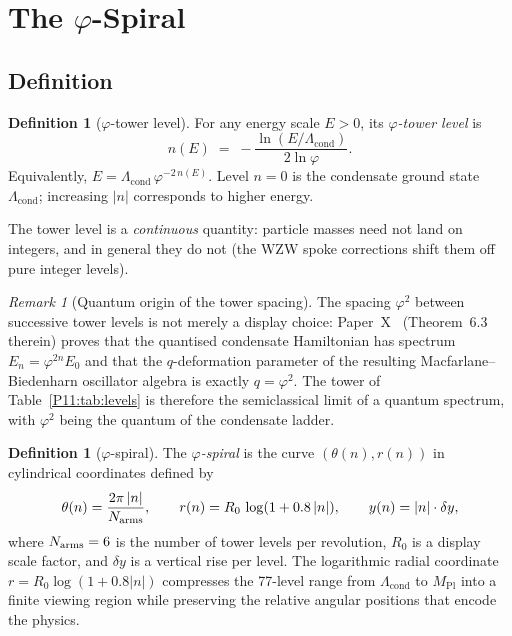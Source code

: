\documentclass[11pt,a4paper]{article}
\theoremstyle{definition}
\newtheorem{definition}[theorem]{Definition}
\theoremstyle{remark}
\newtheorem{remark}[theorem]{Remark}
\newcommand{\vp}{\varphi}
\newcommand{\Lcond}{\Lambda_{\mathrm{cond}}}
\newcommand{\MPl}{M_{\mathrm{Pl}}}
\newcommand{\nlvl}[1]{n\!\left(#1\right)}
\begin{document}
\section{The $\vp$-Spiral}
\label{P11:sec:spiral}

\subsection{Definition}

\begin{definition}[$\vp$-tower level]
\label{P11:def:tower_level}
For any energy scale $E > 0$, its \emph{$\vp$-tower level} is
\begin{equation}
  \nlvl{E} \;=\; -\frac{\ln(E/\Lcond)}{2\ln\vp}.
  \label{P11:eq:tower_level}
\end{equation}
Equivalently, $E = \Lcond\,\vp^{-2\,n(E)}$.
Level $n=0$ is the condensate ground state $\Lcond$;
increasing $|n|$ corresponds to higher energy.
\end{definition}

The tower level is a \emph{continuous} quantity: particle masses
need not land on integers, and in general they do not (the
WZW spoke corrections shift them off pure integer levels).

\begin{remark}[Quantum origin of the tower spacing]
\label{P11:rem:quantum_tower_origin}
The spacing $\vp^2$ between successive tower levels is not merely a
display choice: Paper~X~\cite{Paper10} (Theorem~6.3 therein) proves that
the quantised condensate Hamiltonian has spectrum $E_n = \vp^{2n}E_0$
and that the $q$-deformation parameter of the resulting Macfarlane--Biedenharn
oscillator algebra is exactly $q = \vp^2$.
The tower of Table~\ref{P11:tab:levels} is therefore the semiclassical limit
of a quantum spectrum, with $\vp^2$ being the quantum of the condensate ladder.
\end{remark}

\begin{definition}[$\vp$-spiral]
\label{P11:def:spiral}
The \emph{$\vp$-spiral} is the curve
$(\theta(n), r(n))$ in cylindrical coordinates defined by
\begin{equation}
  \theta(n) = \frac{2\pi\,|n|}{N_{\rm arms}},
  \qquad
  r(n) = R_0\,\log(1 + 0.8\,|n|),
  \qquad
  y(n) = |n|\cdot\delta y,
  \label{P11:eq:spiral}
\end{equation}
where $N_{\rm arms} = 6$ is the number of tower levels per revolution,
$R_0$ is a display scale factor, and $\delta y$ is a vertical rise per
level.
The logarithmic radial coordinate $r = R_0\log(1+0.8|n|)$ compresses
the 77-level range from $\Lcond$ to $\MPl$ into a finite viewing
region while preserving the relative angular positions that encode
the physics.
\end{definition}
\end{document}
